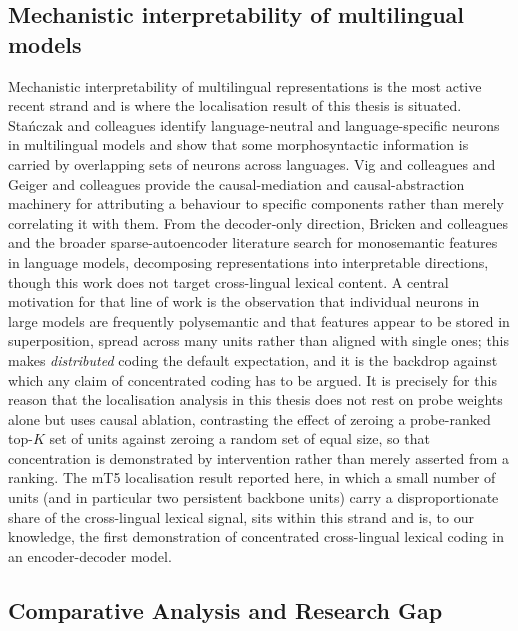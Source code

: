 \subsection{Mechanistic interpretability of multilingual models}

Mechanistic interpretability of multilingual representations is the most active recent strand and is where the localisation result of this thesis is situated. Sta\'nczak and colleagues \cite{stanczak2022neurons} identify language-neutral and language-specific neurons in multilingual models and show that some morphosyntactic information is carried by overlapping sets of neurons across languages. Vig and colleagues \cite{vig2020investigating} and Geiger and colleagues \cite{geiger2021causal} provide the causal-mediation and causal-abstraction machinery for attributing a behaviour to specific components rather than merely correlating it with them. From the decoder-only direction, Bricken and colleagues \cite{bricken2023monosemanticity} and the broader sparse-autoencoder literature search for monosemantic features in language models, decomposing representations into interpretable directions, though this work does not target cross-lingual lexical content. A central motivation for that line of work is the observation that individual neurons in large models are frequently polysemantic and that features appear to be stored in superposition, spread across many units rather than aligned with single ones; this makes \emph{distributed} coding the default expectation, and it is the backdrop against which any claim of concentrated coding has to be argued. It is precisely for this reason that the localisation analysis in this thesis does not rest on probe weights alone but uses causal ablation, contrasting the effect of zeroing a probe-ranked top-$K$ set of units against zeroing a random set of equal size, so that concentration is demonstrated by intervention rather than merely asserted from a ranking. The mT5 localisation result reported here, in which a small number of units (and in particular two persistent backbone units) carry a disproportionate share of the cross-lingual lexical signal, sits within this strand and is, to our knowledge, the first demonstration of concentrated cross-lingual lexical coding in an encoder-decoder model.

\subsection{Comparative Analysis and Research Gap}


